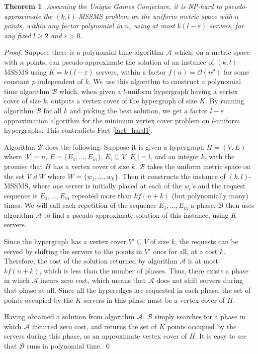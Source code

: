 \documentclass[11pt]{article}
\theoremstyle{plain}\newtheorem{theorem}{Theorem}
\theoremstyle{definition}
\theoremstyle{remark}
\begin{document}
\begin{theorem}\label{thm_hardness}
Assuming the Unique Games Conjecture, it is NP-hard to pseudo-approximate the $(k,l)$-MSSMS problem on the uniform metric space with $n$ points, within any factor polynomial in $n$, using at most $k(l-\varepsilon)$ servers, for any fixed $l\geq 2$ and $\varepsilon>0$.
\end{theorem}



\begin{proof}
Suppose there is a polynomial time algorithm $\mathcal{A}$ which, on a metric space with $n$ points, can pseudo-approximate the solution of an instance of $(k,l)$-MSSMS using $K=k(l-\varepsilon)$ servers, within a factor $f(n)=\mathcal{O}(n^p)$ for some constant $p$ independent of $k$. We use this algorithm to construct a polynomial time algorithm $\mathcal{B}$ which, when given a $l$-uniform hypergraph having a vertex cover of size $k$, outputs a vertex cover of the hypergraph of size $K$. By running algorithm $\mathcal{B}$ for all $k$ and picking the best solution, we get a factor $l-\varepsilon$ approximation algorithm for the minimum vertex cover problem on $l$-uniform hypergraphs. This contradicts Fact \ref{fact_hard1}.

Algorithm $\mathcal{B}$ does the following. Suppose it is given a hypergraph $H=(V,E)$ where $|V|=n$, $E=\{E_1,\dots,E_m\}$, $E_i\subseteq V$ $|E_i|=l$, and an integer $k$, with the promise that $H$ has a vertex cover of size $k$. $\mathcal{B}$ takes the uniform metric space on the set $V\uplus W$ where $W=\{w_1,\ldots,w_k\}$. Then it constructs the instance of $(k,l)$-MSSMS, where one server is initially placed at each of the $w_i$'s and the request sequence is $E_1,\ldots,E_m$ repeated more than $kf(n+k)$ (but polynomially many) times. We will call each repetition of the sequence $E_1,\ldots,E_m$ a phase. $\mathcal{B}$ then uses algorithm $\mathcal{A}$ to find a pseudo-approximate solution of this instance, using $K$ servers.

Since the hypergraph has a vertex cover $V'\subseteq V$ of size $k$, the requests can be served by shifting the servers to the points in $V'$ once for all, at a cost $k$. Therefore, the cost of the solution returned by algorithm $\mathcal{A}$ is at most $kf(n+k)$, which is less than the number of phases. Thus, there exists a phase in which $\mathcal{A}$ incurs zero cost, which means that $\mathcal{A}$ does not shift servers during that phase at all. Since all the hyperedges are requested in each phase, the set of points occupied by the $K$ servers in this phase must be a vertex cover of $H$.


Having obtained a solution from algorithm $\mathcal{A}$, $\mathcal{B}$ simply searches for a phase in which $\mathcal{A}$ incurred zero cost, and returns the set of $K$ points occupied by the servers during this phase, as an approximate vertex cover of $H$. It is easy to see that 
$\mathcal{B}$ runs in polynomial time. \qed
\end{proof}
\end{document}
